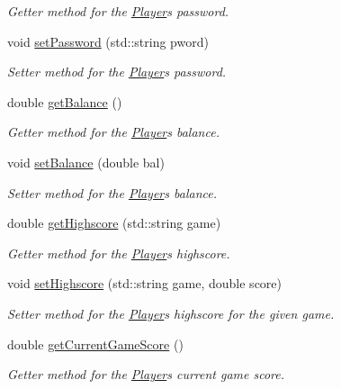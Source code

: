 \begin{DoxyCompactItemize}
\begin{DoxyCompactList}\small\item\em Getter method for the \mbox{\hyperlink{class_player}{Player}}\textquotesingle{}s password. \end{DoxyCompactList}\item 
void \mbox{\hyperlink{class_player_afff83ec36cc74b248cf1a723ab0c2b6a}{set\+Password}} (std\+::string pword)
\begin{DoxyCompactList}\small\item\em Setter method for the \mbox{\hyperlink{class_player}{Player}}\textquotesingle{}s password. \end{DoxyCompactList}\item 
double \mbox{\hyperlink{class_player_a0e9f70886f4a7544422931103e59ea26}{get\+Balance}} ()
\begin{DoxyCompactList}\small\item\em Getter method for the \mbox{\hyperlink{class_player}{Player}}\textquotesingle{}s balance. \end{DoxyCompactList}\item 
void \mbox{\hyperlink{class_player_a7bdcb72d5d22f6f7c1dfa48d960b6d73}{set\+Balance}} (double bal)
\begin{DoxyCompactList}\small\item\em Setter method for the \mbox{\hyperlink{class_player}{Player}}\textquotesingle{}s balance. \end{DoxyCompactList}\item 
double \mbox{\hyperlink{class_player_a42286b7c54da75f7b64200796f149d4c}{get\+Highscore}} (std\+::string game)
\begin{DoxyCompactList}\small\item\em Getter method for the \mbox{\hyperlink{class_player}{Player}}\textquotesingle{}s highscore. \end{DoxyCompactList}\item 
void \mbox{\hyperlink{class_player_ae77a5ec07cea02f94c7c8bc9830e2521}{set\+Highscore}} (std\+::string game, double score)
\begin{DoxyCompactList}\small\item\em Setter method for the \mbox{\hyperlink{class_player}{Player}}\textquotesingle{}s highscore for the given game. \end{DoxyCompactList}\item 
double \mbox{\hyperlink{class_player_a0aade73735727e68e4f07734e76c875a}{get\+Current\+Game\+Score}} ()
\begin{DoxyCompactList}\small\item\em Getter method for the \mbox{\hyperlink{class_player}{Player}}\textquotesingle{}s current game score. \end{DoxyCompactList}\item 

\end{DoxyCompactItemize}
